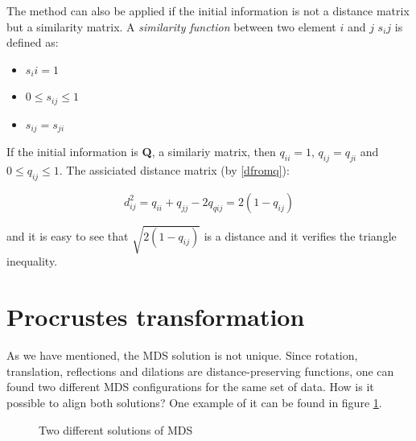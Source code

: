 \documentclass[11pt]{report}
\begin{document}
\indent The method can also be applied if the initial information is not a distance matrix
but a similarity matrix. A \textit{similarity function} between two element $i$
and $j$ $s_ij$ is defined as:

\begin{itemize}
\item $s_ii = 1$
\item $0 \leq s_{ij} \leq 1$
\item $s_{ij} = s_{ji}$
\end{itemize}

If the initial information is \textbf{Q}, a similariy matrix, then $q_{ii} = 1$,
$q_{ij} = q_{ji}$ and $0 \leq q_{ij} \leq 1$. The assiciated distance matrix 
(by \ref{dfromq}):

$$d_{ij}^2 = q_{ii} + q_{jj} - 2q_{qij} = 2(1-q_{ij})$$

and it is easy to see that $\sqrt{2(1-q_{ij})}$ is a distance and it verifies
the triangle inequality.


\section{Procrustes transformation}
As we have mentioned, the MDS solution is not unique. Since rotation, translation,
reflections and dilations are distance-preserving functions, one can found two
different MDS configurations for the same set of data. How is it possible to
align both solutions? One example of it can be found in figure \ref{twosol}.

\begin{figure}[ht]
    \centering
    \qquad
    \caption{Two different solutions of MDS}%
    \label{twosol}%
\end{figure}
\end{document}
